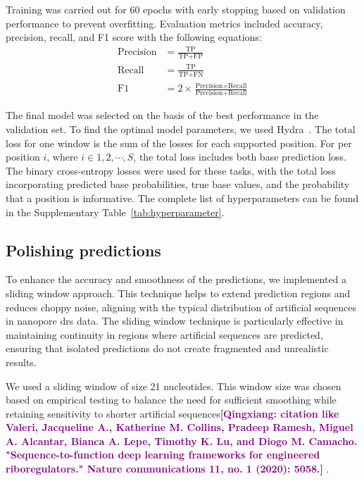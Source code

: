 \documentclass[pdflatex,sn-nature, lineno]{sn-jnl}%
\newcommand{\qx}[1]{\textcolor{purple}{\textbf{[Qingxiang: #1]}}}
\theoremstyle{thmstyleone}%
\theoremstyle{thmstyletwo}%
\theoremstyle{thmstylethree}%
\begin{document}
Training was carried out for \num{60} epochs with early stopping based on validation performance to prevent overfitting.
Evaluation metrics included accuracy, precision, recall, and F1 score with the following equations:
\begin{align*}
	\textrm{Precision} & = \frac{\textrm{TP}}{\textrm{TP}+\textrm{FP}}                                                     \\
	\textrm{Recall}    & = \frac{\textrm{TP}}{\textrm{TP}+\textrm{FN}}                                                     \\
	\textrm{F1}        & = 2 \times \frac{\textrm{Precision} \times \textrm{Recall}}{\textrm{Precision} + \textrm{Recall}}
\end{align*}

The final model was selected on the basis of the best performance in the validation set.
To find the optimal model parameters, we used Hydra~\cite{Yadan2019Hydra}.
The total loss for one window is the sum of the losses for each supported position.
For per position \( i \), where \( i  \in {1, 2, \cdots, S} \),  the total loss includes both base prediction loss.
The binary cross-entropy losses were used for these tasks, with the total loss incorporating predicted base probabilities, true base values, and the probability that a position is informative.
The complete list of hyperparameters can be found in the Supplementary Table~\ref{tab:hyperparameter}.

\subsection{Polishing predictions}

To enhance the accuracy and smoothness of the predictions, we implemented a sliding window approach.
This technique helps to extend prediction regions and reduces choppy noise, aligning with the typical distribution of artificial sequences in nanopore \gls{drs} data.
The sliding window technique is particularly effective in maintaining continuity in regions where artificial sequences are predicted, ensuring that isolated predictions do not create fragmented and unrealistic results.

We used a sliding window of size 21 nucleotides.
This window size was chosen based on empirical testing to balance the need for sufficient smoothing while retaining sensitivity to shorter artificial sequences\qx{citation like Valeri, Jacqueline A., Katherine M. Collins, Pradeep Ramesh, Miguel A. Alcantar, Bianca A. Lepe, Timothy K. Lu, and Diogo M. Camacho. "Sequence-to-function deep learning frameworks for engineered riboregulators." Nature communications 11, no. 1 (2020): 5058.} .
\end{document}
